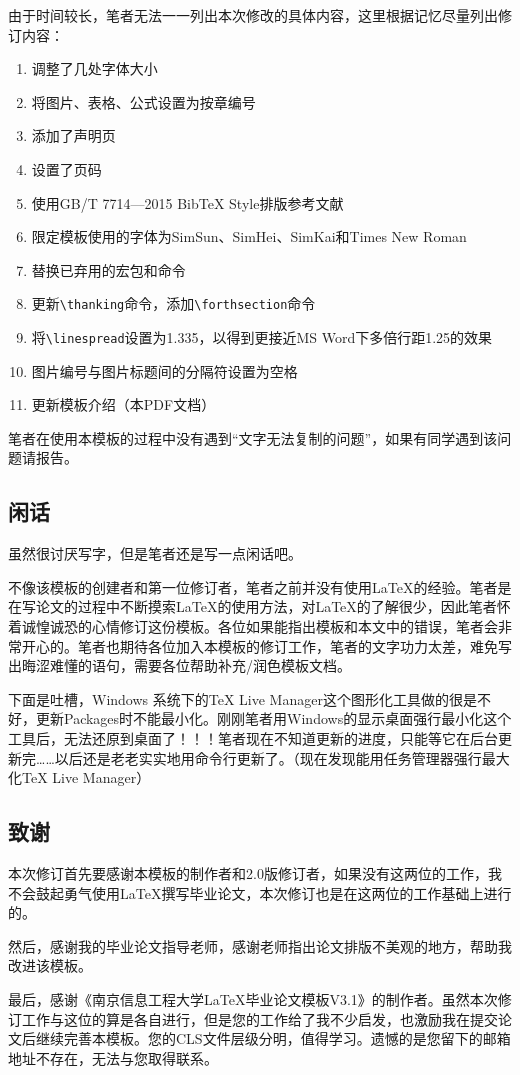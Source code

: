 由于时间较长，笔者无法一一列出本次修改的具体内容，这里根据记忆尽量列出修订内容：
\begin{enumerate}[1、]
    \item 调整了几处字体大小
    \item 将图片、表格、公式设置为按章编号
    \item 添加了声明页
    \item 设置了页码
    \item 使用GB/T 7714—2015 BibTeX Style排版参考文献
    \item 限定模板使用的字体为SimSun、SimHei、SimKai和Times New Roman
    \item 替换已弃用的宏包和命令
    \item 更新\verb|\thanking|命令，添加\verb|\forthsection|命令
    \item 将\verb|\linespread|设置为1.335，以得到更接近MS Word下多倍行距1.25的效果
    \item 图片编号与图片标题间的分隔符设置为空格
    \item 更新模板介绍（本PDF文档）
\end{enumerate}

笔者在使用本模板的过程中没有遇到“文字无法复制的问题”，如果有同学遇到该问题请报告。

\subsection{闲话}

虽然很讨厌写字，但是笔者还是写一点闲话吧。

不像该模板的创建者和第一位修订者，笔者之前并没有使用\LaTeX 的经验。笔者是在写论文的过程中不断摸索\LaTeX 的使用方法，对\LaTeX 的了解很少，因此笔者怀着诚惶诚恐的心情修订这份模板。各位如果能指出模板和本文中的错误，笔者会非常开心的。笔者也期待各位加入本模板的修订工作，笔者的文字功力太差，难免写出晦涩难懂的语句，需要各位帮助补充/润色模板文档。

下面是吐槽，Windows 系统下的TeX Live Manager这个图形化工具做的很是不好，更新Packages时不能最小化。刚刚笔者用Windows的显示桌面强行最小化这个工具后，无法还原到桌面了！！！笔者现在不知道更新的进度，只能等它在后台更新完……以后还是老老实实地用命令行更新了。（现在发现能用任务管理器强行最大化TeX Live Manager）

\subsection{致谢}
本次修订首先要感谢本模板的制作者和2.0版修订者，如果没有这两位的工作，我不会鼓起勇气使用\LaTeX 撰写毕业论文，本次修订也是在这两位的工作基础上进行的。

然后，感谢我的毕业论文指导老师，感谢老师指出论文排版不美观的地方，帮助我改进该模板。

最后，感谢《南京信息工程大学LaTeX毕业论文模板V3.1》的制作者。虽然本次修订工作与这位的算是各自进行，但是您的工作给了我不少启发，也激励我在提交论文后继续完善本模板。您的CLS文件层级分明，值得学习。遗憾的是您留下的邮箱地址不存在，无法与您取得联系。